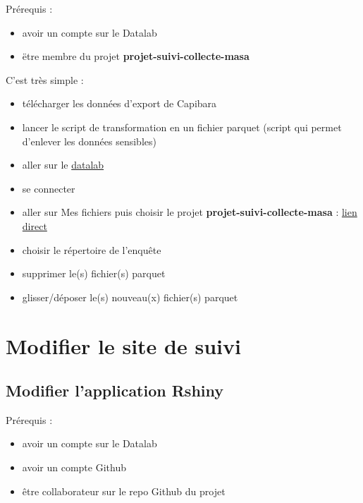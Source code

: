 \documentclass[
  letterpaper,
  DIV=11,
  numbers=noendperiod]{scrreprt}
\providecommand{\tightlist}{%
  \setlength{\itemsep}{0pt}\setlength{\parskip}{0pt}}\usepackage{longtable,booktabs,array}
\begin{document}
Prérequis :

\begin{itemize}
\tightlist
\item
  avoir un compte sur le Datalab\\
\item
  ëtre membre du projet \textbf{projet-suivi-collecte-masa}
\end{itemize}

C'est très simple :

\begin{itemize}
\tightlist
\item
  télécharger les données d'export de Capibara\\
\item
  lancer le script de transformation en un fichier parquet (script qui
  permet d'enlever les données sensibles)\\
\item
  aller sur le \href{https://datalab.sspcloud.fr/}{datalab}
\item
  se connecter\\
\item
  aller sur Mes fichiers puis choisir le projet
  \textbf{projet-suivi-collecte-masa} :
  \href{https://datalab.sspcloud.fr/my-files/projet-suivi-collecte-masa}{lien
  direct}\\
\item
  choisir le répertoire de l'enquête\\
\item
  supprimer le(s) fichier(s) parquet\\
\item
  glisser/déposer le(s) nouveau(x) fichier(s) parquet
\end{itemize}

\hypertarget{modifier-le-site-de-suivi}{%
\section{Modifier le site de suivi}\label{modifier-le-site-de-suivi}}

\hypertarget{modifier-lapplication-rshiny}{%
\subsection{Modifier l'application
Rshiny}\label{modifier-lapplication-rshiny}}

Prérequis :

\begin{itemize}
\tightlist
\item
  avoir un compte sur le Datalab\\
\item
  avoir un compte Github\\
\item
  être collaborateur sur le repo Github du projet
\end{itemize}
\end{document}
